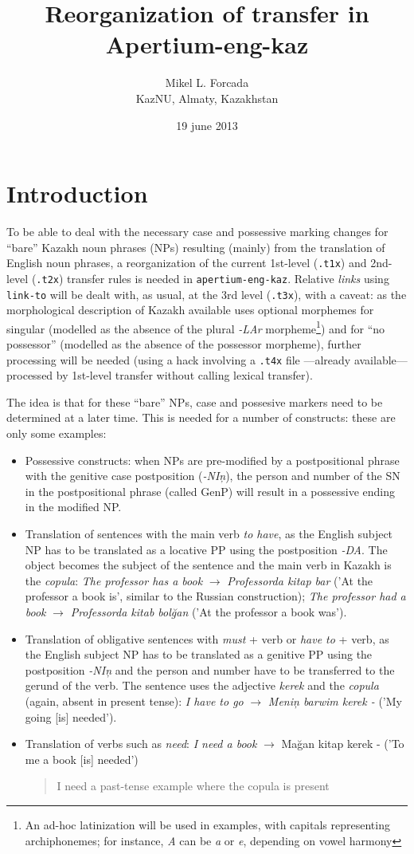 \documentclass{article}
\title{Reorganization of transfer in Apertium-eng-kaz}
\author{Mikel L. Forcada \\ KazNU, Almaty, Kazakhstan}
\date{19 june 2013}
\newcommand{\com}[1]{\begin{quote}\begin{sf}#1\end{sf}\end{quote}}
\begin{document}
\maketitle

\section{Introduction}
To be able to deal with the necessary case and possessive marking changes for ``bare'' Kazakh noun phrases (NPs) resulting (mainly) from the translation of English noun phrases, a reorganization of the current 1st-level (\texttt{.t1x}) and 2nd-level (\texttt{.t2x}) transfer rules is needed in \texttt{apertium-eng-kaz}. Relative \emph{links} using \texttt{link-to} will be dealt with, as usual, at the 3rd level (\texttt{.t3x}), with a caveat: as the morphological description of Kazakh available uses optional morphemes for singular (modelled as the absence of the plural \emph{-LAr} morpheme\footnote{An ad-hoc latinization will be used in examples, with capitals representing archiphonemes; for instance, \emph{A} can be \emph{a} or \emph{e}, depending on vowel harmony}) and for ``no possessor'' (modelled as the absence of the possessor morpheme), further processing will be needed (using a hack involving a \texttt{.t4x} file ---already available--- processed by 1st-level transfer without calling lexical transfer). 

The idea is that for these ``bare'' NPs, case and possesive markers need to be determined at a later time. This is needed for a number of constructs: these are only some examples:
\begin{itemize}
\item Possessive constructs: when NPs are pre-modified by a postpositional phrase with the genitive case postposition (\emph{-NI\c{n}}), the person and number of the SN in the postpositional phrase (called \(\mathrm{GenP}\)) will result in a possessive ending in the modified NP.
\item Translation of sentences with the main verb \emph{to have}, as the English subject NP has to be translated as a locative PP using the postposition \emph{-DA}. The object becomes the subject of the sentence and the main verb in Kazakh is the \emph{copula}:
\emph{The professor has a book} \(\to\) \emph{Professorda kitap bar} ('At the professor a book is',  similar to the Russian construction); \emph{The professor had a book} \(\to\) \emph{Professorda kitab bol\u{g}an} ('At the professor a book was').
\item Translation of obligative sentences with \emph{must} + verb or \emph{have to} + verb, as the English subject NP has to be translated as a genitive PP using the postposition \emph{-NI\c{n}} and the person and  number have to be transferred to the gerund of the verb. The sentence uses the adjective \emph{kerek} and the \emph{copula} (again, absent in present tense):
\emph{I have to go} \(\to\) \emph{Meni\c{n} barwim kerek -} ('My going [is] needed').
\item Translation of verbs such as \emph{need}: \emph{I need a book} \(\to\) {Ma\u{g}an kitap kerek -} ('To me a book [is] needed')
\com{I need a past-tense example where the copula is present}
\end{itemize}
\com{[The last list may be completed]}
\end{document}
